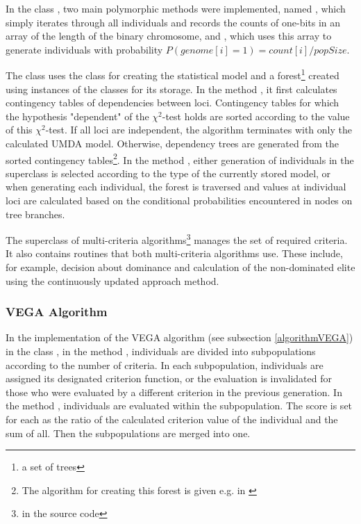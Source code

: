 In the class , two main polymorphic methods were implemented,
named
, which simply iterates through all individuals and records the counts
of one-bits in an array of the length of the binary chromosome,
and , which uses this array to generate individuals
with probability $P(genome[i] = 1) = count[i]/popSize$.

The class  uses the class  for creating the statistical model
and a forest\footnote{a set of trees}
created using instances of the  classes for its storage. In the method , it first calculates
contingency tables of dependencies between loci. Contingency tables for which
the hypothesis "dependent" of the $\chi^2$-test holds are sorted according to the value
of this $\chi^2$-test. If all loci are independent, the algorithm
terminates with only the calculated UMDA model. Otherwise, dependency trees
are generated from the sorted contingency tables\footnote{The algorithm for creating this forest is given e.g. in \cite{evo}}.
In the method , either generation of individuals in the superclass is selected according to the type of the currently stored model,
or when generating each individual,
the forest is traversed and values at individual loci are calculated based on
the conditional probabilities encountered in nodes on tree branches.

\bigskip

The superclass of multi-criteria
algorithms\footnote{in the source code }
manages the set of required criteria. It also contains routines that
both multi-criteria algorithms use. These include, for example,
decision about dominance and calculation of the non-dominated elite using the
continuously updated approach method.

\subsubsection{VEGA Algorithm}
In the implementation of the VEGA algorithm (see subsection \ref{algorithmVEGA})
in the class , in the method ,
individuals are divided into subpopulations according to the number of criteria. In each subpopulation,
individuals are assigned its designated criterion function,
or the evaluation is invalidated for those
who were evaluated by a different criterion in the previous generation.
In the method , individuals
are evaluated within the subpopulation. The score is set for each as the ratio
of the calculated criterion value of the individual and the sum of all. Then the subpopulations
are merged into one.

